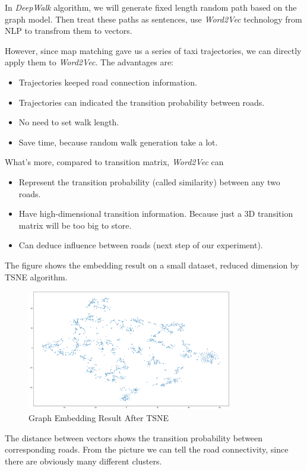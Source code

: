 \documentclass[fontset=none]{ctexart}
\theoremstyle{definition}
\theoremstyle{remark}
\begin{document}
In \textit{DeepWalk} algorithm, we will generate fixed length random path based on the graph model.
Then treat these paths as sentences, use \textit{Word2Vec} technology from NLP to transfrom them to vectors.

However, since map matching gave us a series of taxi trajectories, we can directly apply them to \textit{Word2Vec}.
The advantages are:
\begin{itemize}
  \item Trajectories keeped road connection information.
  \item Trajectories can indicated the transition probability between roads.
  \item No need to set walk length.
  \item Save time, because random walk generation take a lot.
\end{itemize}

What's more, compared to transition matrix, \textit{Word2Vec} can
\begin{itemize}
  \item Represent the transition probability (called similarity) between any two roads.
  \item Have high-dimensional transition information. Because just a 3D transition matrix will be too big to store.
  \item Can deduce influence between roads (next step of our experiment).
\end{itemize}

\clearpage
The figure shows the embedding result on a small dataset, reduced dimension by TSNE algorithm.
\begin{figure}[htb]
  \centering
  \includegraphics[width=0.8\textwidth]{images/8-2-6.png}
  \caption{Graph Embedding Result After TSNE}
  \label{fig: 826}
\end{figure}

The distance between vectors shows the transition probability between corresponding roads.
From the picture we can tell the road connectivity, since there are obviously many different clusters.
\end{document}
